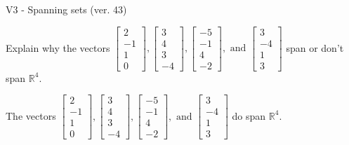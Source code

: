 \begin{exercise}
  \begin{exerciseTitle}V3 - Spanning sets (ver. 43)\end{exerciseTitle}
  \begin{exerciseStatement}
    Explain why the vectors \(\left[\begin{array}{r}
2 \\
-1 \\
1 \\
0
\end{array}\right] , \left[\begin{array}{r}
3 \\
4 \\
3 \\
-4
\end{array}\right] , \left[\begin{array}{r}
-5 \\
-1 \\
4 \\
-2
\end{array}\right] , \text{ and } \left[\begin{array}{r}
3 \\
-4 \\
1 \\
3
\end{array}\right]\) span or don't span \(\mathbb{R}^4\). 
	


  \end{exerciseStatement}
  \begin{exerciseAnswer}
   The vectors \(\left[\begin{array}{r}
2 \\
-1 \\
1 \\
0
\end{array}\right] , \left[\begin{array}{r}
3 \\
4 \\
3 \\
-4
\end{array}\right] , \left[\begin{array}{r}
-5 \\
-1 \\
4 \\
-2
\end{array}\right] , \text{ and } \left[\begin{array}{r}
3 \\
-4 \\
1 \\
3
\end{array}\right]\) 
  	 do  
	span \(\mathbb{R}^4\).
  


  \end{exerciseAnswer}
\end{exercise}
